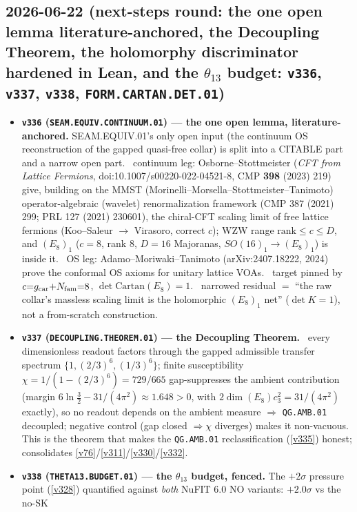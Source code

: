 \subsection*{2026-06-22 (next-steps round: the one open lemma literature-anchored, the Decoupling Theorem, the holomorphy discriminator hardened in Lean, and the $\theta_{13}$ budget: \texttt{v336}, \texttt{v337}, \texttt{v338}, \texttt{FORM.CARTAN.DET.01})}
\begin{itemize}
\item \textbf{\texttt{v336} (\texttt{SEAM.EQUIV.CONTINUUM.01}) --- the one open lemma, literature-anchored.}
SEAM.EQUIV.01's only open input (the continuum OS reconstruction of the gapped quasi-free collar) is split into a
CITABLE part and a narrow open part. \mC\ continuum leg: Osborne--Stottmeister (\emph{CFT
from Lattice Fermions}, doi:10.1007/s00220-022-04521-8, CMP \textbf{398} (2023) 219) give, building on the
MMST (Morinelli--Morsella--Stottmeister--Tanimoto) operator-algebraic (wavelet) renormalization framework
(CMP 387 (2021) 299; PRL 127 (2021) 230601), the chiral-CFT scaling limit of free lattice fermions (Koo--Saleur
$\to$ Virasoro, correct $c$); WZW range $\mathrm{rank}\le c\le D$, and $(E_8)_1$ ($c{=}8$, rank 8, $D{=}16$
Majoranas, $SO(16)_1\!\to\!(E_8)_1$) is inside it. \mC\ OS leg: Adamo--Moriwaki--Tanimoto (arXiv:2407.18222, 2024)
prove the conformal OS axioms for unitary lattice VOAs. \mE\ target pinned by $c{=}g_{\mathrm{car}}{+}N_{\mathrm{fam}}{=}8$,
$\det\mathrm{Cartan}(E_8){=}1$. \mO\ narrowed residual $=$ ``the raw collar's massless scaling limit is the
holomorphic $(E_8)_1$ net'' ($\det K{=}1$), not a from-scratch construction.
\item \textbf{\texttt{v337} (\texttt{DECOUPLING.THEOREM.01}) --- the Decoupling Theorem.} \mE\ every dimensionless
readout factors through the gapped admissible transfer spectrum $\{1,(2/3)^6,(1/3)^6\}$; finite susceptibility
$\chi=1/(1-(2/3)^6)=729/665$ gap-suppresses the ambient contribution (margin $6\ln\tfrac32-31/(4\pi^2)\approx
1.648>0$, with $2\dim(E_8)c_3^2=31/(4\pi^2)$ exactly), so no readout depends on the ambient measure $\Rightarrow$
\texttt{QG.AMB.01} decoupled; negative control (gap closed $\Rightarrow\chi$ diverges) makes it non-vacuous. This is
the theorem that makes the \texttt{QG.AMB.01} reclassification (\vref{v335}) honest; consolidates
\vref{v76}/\vref{v311}/\vref{v330}/\vref{v332}.
\item \textbf{\texttt{v338} (\texttt{THETA13.BUDGET.01}) --- the $\theta_{13}$ budget, fenced.} The $+2\sigma$
pressure point (\vref{v328}) quantified against \emph{both} NuFIT 6.0 NO variants: $+2.0\sigma$ vs the no-SK

\end{itemize}

